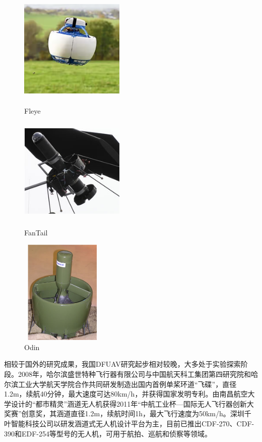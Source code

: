 \begin{figure}[htbp]
	\centering
	\begin{minipage}[c]{0.33\textwidth} %
		\centering
		\includegraphics[width=5cm,height=5cm]{Fig/Fleye.png}
		\caption{\label{Fleye}Fleye}
	\end{minipage}%
	\begin{minipage}[c]{0.33\textwidth}
		\centering
		\includegraphics[width=5cm,height=5cm]{Fig/FanTail.png}
		\caption{\label{FanTail}FanTail}
	\end{minipage}
    \begin{minipage}[c]{0.33\textwidth}
		\centering
		\includegraphics[width=4cm,height=5cm]{Fig/odin.jpg}
		\caption{\label{odin}Odin}
	\end{minipage}
\end{figure}

相较于国外的研究成果，我国DFUAV研究起步相对较晚，大多处于实验探索阶段。2008年，哈尔滨盛世特种飞行器有限公司与中国航天科工集团第四研究院和哈尔滨工业大学航天学院合作共同研发制造出国内首例单桨环道“飞碟”，直径1.2m，续航40分钟，最大速度可达80km/h，并获得国家发明专利。由南昌航空大学设计的“都市精灵”涵道无人机获得2011年“中航工业杯—国际无人飞行器创新大奖赛”创意奖，其涵道直径1.2m，续航时间1h，最大飞行速度为50km/h。深圳千叶智能科技公司以研发涵道式无人机设计平台为主，目前已推出CDF-270、CDF-390和EDF-254等型号的无人机，可用于航拍、巡航和侦察等领域。


